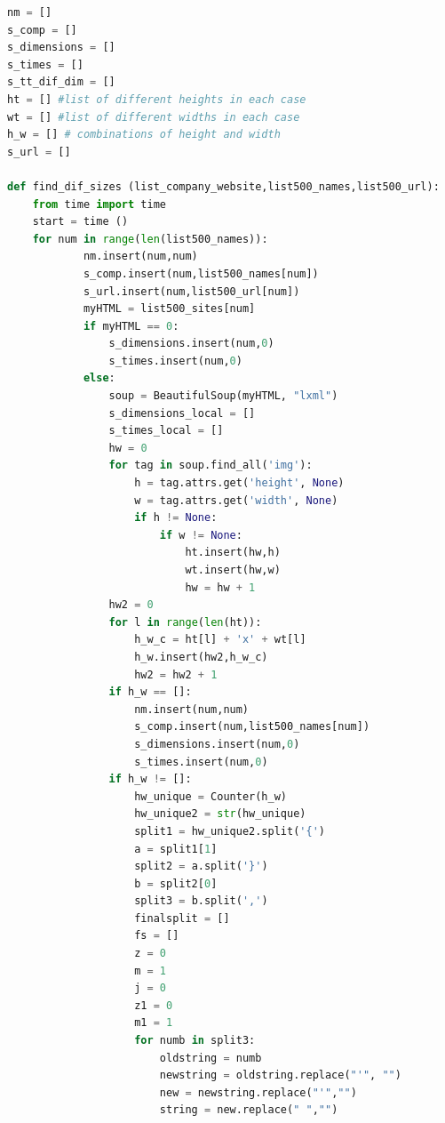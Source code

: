 \documentclass{article}
\begin{document}
\begin{lstlisting}[language=Python]
nm = []
s_comp = []
s_dimensions = []
s_times = []
s_tt_dif_dim = []
ht = [] #list of different heights in each case
wt = [] #list of different widths in each case
h_w = [] # combinations of height and width
s_url = []

def find_dif_sizes (list_company_website,list500_names,list500_url):
    from time import time 
    start = time ()
    for num in range(len(list500_names)):
            nm.insert(num,num)                  
            s_comp.insert(num,list500_names[num])
            s_url.insert(num,list500_url[num])
            myHTML = list500_sites[num] 
            if myHTML == 0:
                s_dimensions.insert(num,0)
                s_times.insert(num,0)    
            else: 
                soup = BeautifulSoup(myHTML, "lxml") 
                s_dimensions_local = []
                s_times_local = []
                hw = 0  
                for tag in soup.find_all('img'):
                    h = tag.attrs.get('height', None)
                    w = tag.attrs.get('width', None)
                    if h != None:
                        if w != None:
                            ht.insert(hw,h)
                            wt.insert(hw,w)
                            hw = hw + 1                        
                hw2 = 0
                for l in range(len(ht)):
                    h_w_c = ht[l] + 'x' + wt[l]
                    h_w.insert(hw2,h_w_c)                     
                    hw2 = hw2 + 1    
                if h_w == []:
                    nm.insert(num,num)                  
                    s_comp.insert(num,list500_names[num])
                    s_dimensions.insert(num,0)
                    s_times.insert(num,0)    
                if h_w != []:
                    hw_unique = Counter(h_w)
                    hw_unique2 = str(hw_unique)                    
                    split1 = hw_unique2.split('{')
                    a = split1[1]
                    split2 = a.split('}')
                    b = split2[0]
                    split3 = b.split(',')
                    finalsplit = []
                    fs = []
                    z = 0
                    m = 1
                    j = 0
                    z1 = 0
                    m1 = 1                    
                    for numb in split3:                
                        oldstring = numb
                        newstring = oldstring.replace("'", "")
                        new = newstring.replace("'","")
                        string = new.replace(" ","")

\end{lstlisting}
\end{document}
